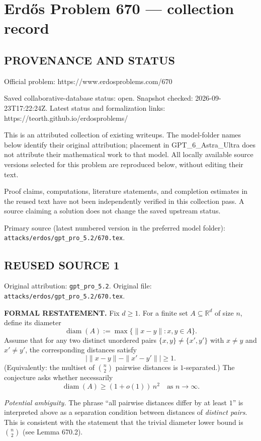 \section*{Erd\H{o}s Problem 670 --- collection record}

\subsection*{PROVENANCE AND STATUS}
Official problem: https://www.erdosproblems.com/670

Saved collaborative-database status: open.
Snapshot checked: 2026-09-23T17:22:24Z.
Latest status and formalization links: https://teorth.github.io/erdosproblems/

This is an attributed collection of existing writeups. The model-folder names below identify their original attribution; placement in GPT\_6\_Astra\_Ultra does not attribute their mathematical work to that model. All locally available source versions selected for this problem are reproduced below, without editing their text.

Proof claims, computations, literature statements, and completion estimates in the reused text have not been independently verified in this collection pass. A source claiming a solution does not change the saved upstream status.

Primary source (latest numbered version in the preferred model folder): \texttt{attacks/erdos/gpt\_pro\_5.2/670.tex}.

\subsection*{REUSED SOURCE 1}
Original attribution: \texttt{gpt\_pro\_5.2}.
Original file: \texttt{attacks/erdos/gpt\_pro\_5.2/670.tex}.



\noindent\textbf{FORMAL RESTATEMENT.}
Fix $d\ge 1$.
For a finite set $A\subseteq\mathbb{R}^d$ of size $n$, define its diameter
\[\operatorname{diam}(A):=\max\{\|x-y\|: x,y\in A\}.
\]
Assume that for any two distinct unordered pairs $\{x,y\}\ne\{x',y'\}$ with $x\ne y$ and $x'\ne y'$, the corresponding distances satisfy
\[\big|\|x-y\| - \|x'-y'\|\big|\ge 1.
\]
(Equivalently: the multiset of $\binom{n}{2}$ pairwise distances is $1$-separated.)
The conjecture asks whether necessarily
\[
\operatorname{diam}(A) \ge (1+o(1))\, n^2\quad\text{as } n\to\infty.
\]

\medskip
\noindent\emph{Potential ambiguity.}
The phrase ``all pairwise distances differ by at least $1$'' is interpreted above as a separation condition between distances of \emph{distinct pairs}. This is consistent with the statement that the trivial diameter lower bound is $\binom n2$ (see Lemma 670.2).

